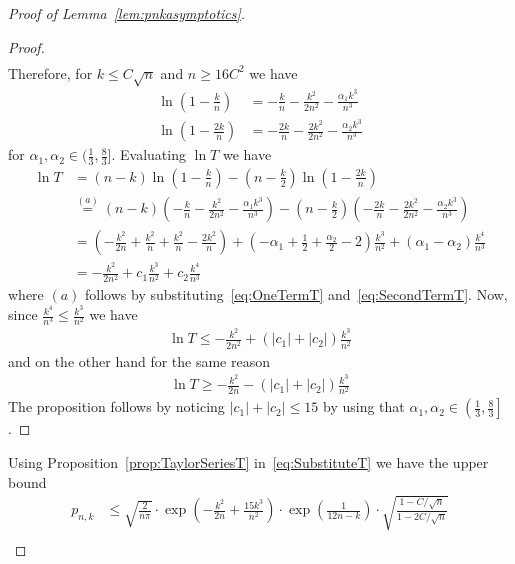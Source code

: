 \documentclass[twoside]{article}
\begin{document}
\begin{proof}[Proof of Lemma~\ref{lem:pnkasymptotics}]
\begin{proof}
\begin{align}
        \end{align}
        Therefore, for $k \le C\sqrt{n}$ and $n \ge 16C^2$ we have 
        \begin{align}
            \ln\left(1-\frac{k}{n}\right) &= -\frac{k}{n} - \frac{k^2}{2n^2} - \frac{\alpha_1k^3}{n^3} \label{eq:OneTermT}\\
            \ln\left(1-\frac{2k}{n}\right) &= -\frac{2k}{n} - \frac{2k^2}{2n^2} - \frac{\alpha_2k^3}{n^3} \label{eq:SecondTermT}
        \end{align}
        for $\alpha_1,\alpha_2 \in \Big(\frac{1}{3},\frac{8}{3}\Big]$. Evaluating $\ln T$ we have 
        \begin{align}
            \ln T &= (n-k)\ln\left(1-\frac{k}{n}\right) - \left(n-\frac{k}{2}\right)\ln\left(1-\frac{2k}{n}\right)  \nonumber\\
            &\stackrel{(a)}{=} (n-k)\left(-\frac{k}{n} - \frac{k^2}{2n^2} - \frac{\alpha_1k^3}{n^3}\right) - \left(n-\frac{k}{2}\right)\left(-\frac{2k}{n} - \frac{2k^2}{2n^2} - \frac{\alpha_2k^3}{n^3}\right) \nonumber\\
            &= \left(-\frac{k^2}{2n}+\frac{k^2}{n}+\frac{k^2}{n}-\frac{2k^2}{n}\right)+\left(-\alpha_1+\frac{1}{2}+\frac{\alpha_2}{2}-2\right)\frac{k^3}{n^2}+\left(\alpha_1-\alpha_2\right)\frac{k^4}{n^3} \nonumber\\
            &= -\frac{k^2}{2n^2} + c_1\frac{k^3}{n^2} + c_2\frac{k^4}{n^3} \label{eq:subc1c2}
        \end{align}
        where $(a)$ follows by substituting~\eqref{eq:OneTermT} and~\eqref{eq:SecondTermT}. Now, since $\frac{k^4}{n^3} \le \frac{k^3}{n^2}$ we have 
        \begin{align}\label{eq:LnTUB}
         \ln T  \le  -\frac{k^2}{2n^2} +  (|c_1|+|c_2|)\frac{k^3}{n^2}
        \end{align}
        and on the other hand for the same reason 
        \begin{align}\label{eq:LnTUB}
            \ln T \ge -\frac{k^2}{2n} - (|c_1|+|c_2|)\frac{k^3}{n^2}
        \end{align}
        The proposition follows by noticing $|c_1|+|c_2| \le 15$ by using that $\alpha_1, \alpha_2 \in \left(\frac{1}{3},\frac{8}{3}\right]$.
    \end{proof}
Using Proposition~\ref{prop:TaylorSeriesT} in~\eqref{eq:SubstituteT} we have the upper bound 
\begin{align}
    p_{n,k} &\le \sqrt{\frac{2}{n\pi}} \cdot \exp\left(-\frac{k^2}{2n}+\frac{15k^3}{n^2}\right)\cdot \exp\left(\frac{1}{12n-k}\right)\cdot\sqrt{\frac{1-C/\sqrt{n}}{1-2C/\sqrt{n}}} \nonumber\\

\end{align}
\end{proof}
\end{document}
